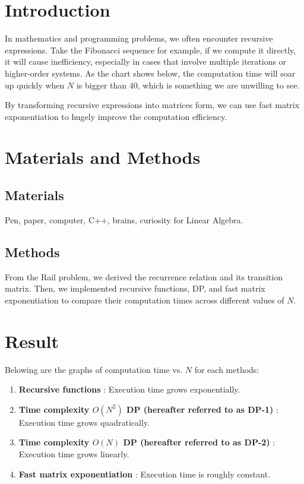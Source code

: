 \section{Introduction}

In mathematics and programming problems, we often encounter recursive expressions.
Take the Fibonacci sequence for example, if we compute it directly, it will cause inefficiency, especially in cases that involve multiple iterations or higher-order systems.
As the chart shows below, the computation time will soar up quickly when $N$ is bigger than $40$, which is something we are unwilling to see.

By transforming recursive expressions into matrices form, we can use fast matrix exponentiation to hugely improve the computation efficiency.

\section{Materials and Methods}
\subsection{Materials}

Pen, paper, computer, C++, brains, curiosity for Linear Algebra.

\subsection{Methods}

From the Rail problem, we derived the recurrence relation and its transition matrix.
Then, we implemented recursive functions, DP, and fast matrix exponentiation to compare their computation times across different values of $N$.

\section{Result}

Belowing are the graphs of computation time vs. $N$ for each methods:
\begin{enumerate}
    \item \textbf{Recursive functions} : Execution time grows exponentially.
    \item \textbf{Time complexity $O(N^2)$ DP (hereafter referred to as DP-1)} : Execution time grows quadratically.
    \item \textbf{Time complexity $O(N)$ DP (hereafter referred to as DP-2)} : Execution time grows linearly.
    \item \textbf{Fast matrix exponentiation} : Execution time is roughly constant.
\end{enumerate}

